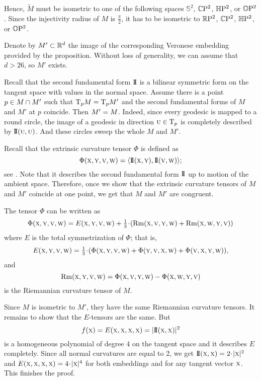 \documentclass[a4paper,10pt]{article}
\begin{document}
Hence, $\tilde M$ must be isometric to one of the following spaces $\mathbb{S}^2$, $\mathbb{C}\mathrm{P}^2$, $\mathbb{H}\mathrm{P}^2$, or $\mathbb{O}\mathrm{P}^2$.
Since the injectivity radius of $M$ is $\tfrac\pi2$, 
it has to be isometric to $\mathbb{R}\mathrm{P}^2$, $\mathbb{C}\mathrm{P}^2$, $\mathbb{H}\mathrm{P}^2$, or $\mathbb{O}\mathrm{P}^2$.

Denote by $M'\subset \mathbb{R}^d$ the image of the corresponding Veronese embedding provided by the proposition.
Without loss of generality, we can assume that $d>26$, so $M'$ exists.

Recall that the second fundamental form $\mathrm{I}\!\mathrm{I}$ is a bilinear symmetric form on the tangent space with values in the normal space.
Assume there is a point $p\z\in M\cap M'$ such that $\mathrm{T}_pM=\mathrm{T}_pM'$ and the second fundamental forms of $M$ and $M'$ at $p$ coincide.
Then $M'\z=M$.
Indeed, since every geodesic is mapped to a round circle, the image of a geodesic in direction ${{\normalfont\textsc{u}}}\in \mathrm{T}_p$ is completely described by $\mathrm{I}\!\mathrm{I}({{\normalfont\textsc{u}}},{{\normalfont\textsc{u}}})$.
And these circles sweep the whole $M$ and $M'$.

Recall that the extrinsic curvature tensor $\Phi$ is defined as
\[\Phi({{\normalfont\textsc{x}}},{{\normalfont\textsc{y}}},{{\normalfont\textsc{v}}},{{\normalfont\textsc{w}}})=\langle \mathrm{I}\!\mathrm{I}({{\normalfont\textsc{x}}},{{\normalfont\textsc{y}}}),\mathrm{I}\!\mathrm{I}({{\normalfont\textsc{v}}},{{\normalfont\textsc{w}}})\rangle;\]
see \cite{petrunin2003}.
Note that it describes the second fundamental form $\mathrm{I}\!\mathrm{I}$ up to motion of the ambient space.
Therefore, once we show that the extrinsic curvature tensors of $M$ and $M'$ coincide at one point,
we get that $M$ and $M'$ are congruent.

The tensor $\Phi$ can be written as
\[\Phi({\mathsc{x}},{\mathsc{y}},{\mathsc{v}},{\mathsc{w}})=E({\mathsc{x}},{\mathsc{y}},{\mathsc{v}},{\mathsc{w}})+\tfrac 1 3\cdot(\Rm({\mathsc{x}},{\mathsc{v}},{\mathsc{y}},{\mathsc{w}})+\Rm({\mathsc{x}},{\mathsc{w}},{\mathsc{y}},{\mathsc{v}}))\]
where $E$ is the total symmetrization of $\Phi$; that is,
$$E({\mathsc{x}},{\mathsc{y}},{\mathsc{v}},{\mathsc{w}})=\tfrac 1 3\cdot
(\Phi({\mathsc{x}},{\mathsc{y}},{\mathsc{v}},{\mathsc{w}})+\Phi({\mathsc{y}},{\mathsc{v}},{\mathsc{x}},{\mathsc{w}})+\Phi({\mathsc{v}},{\mathsc{x}},{\mathsc{y}},{\mathsc{w}})),$$
and
$$\operatorname{\rm Rm}({{\normalfont\textsc{x}}},{{\normalfont\textsc{y}}},{{\normalfont\textsc{v}}},{{\normalfont\textsc{w}}})=\Phi({{\normalfont\textsc{x}}},{{\normalfont\textsc{v}}},{{\normalfont\textsc{y}}},{{\normalfont\textsc{w}}})-\Phi({{\normalfont\textsc{x}}},{{\normalfont\textsc{w}}},{{\normalfont\textsc{y}}},{{\normalfont\textsc{v}}})$$
is the Riemannian curvature tensor of $M$.

Since $M$ is isometric to $M'$, they have the same Riemannian curvature tensors.
It remains to show that the $E$-tensors are the same.
But 
\[f({\mathsc{x}})=E({\mathsc{x}},{\mathsc{x}},{\mathsc{x}},{\mathsc{x}})\z=|\II({\mathsc{x}},{\mathsc{x}})|^2\]
is a homogeneous polynomial of degree $4$ on the tangent space 
and it describes $E$ completely.
Since all normal curvatures are equal to 2,
we get $\II({\mathsc{x}},{\mathsc{x}})\z=2\cdot|{\mathsc{x}}|^2$ and $E({\mathsc{x}},{\mathsc{x}},{\mathsc{x}},{\mathsc{x}})=4\cdot|{\mathsc{x}}|^4$ 
for both embeddings and for any tangent vector ${{\normalfont\textsc{x}}}$.
This finishes the proof.
\qeds
\end{document}

